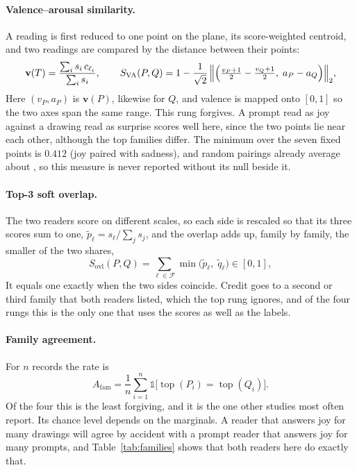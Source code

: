 \paragraph{Valence--arousal similarity.} A reading is first reduced to one point on the plane, its score-weighted centroid, and two readings are compared by the distance between their points:
\begin{equation}
\mathbf{v}(T) = \frac{\sum_i s_i\, c_{\ell_i}}{\sum_i s_i}, \qquad
S_{\mathrm{VA}}(P, Q) = 1 - \frac{1}{\sqrt{2}}\,\Bigl\|\Bigl(\tfrac{v_P + 1}{2} - \tfrac{v_Q + 1}{2},\; a_P - a_Q\Bigr)\Bigr\|_2 ,
\label{eq:va}
\end{equation}
Here $(v_P, a_P)$ is $\mathbf{v}(P)$, likewise for $Q$, and valence is mapped onto $[0,1]$ so the two axes span the same range. This rung forgives. A prompt read as joy against a drawing read as surprise scores well here, since the two points lie near each other, although the top families differ. The minimum over the seven fixed points is $0.412$ (joy paired with sadness), and random pairings already average about \FullNeuVaNull{}, so this measure is never reported without its null beside it.

\paragraph{Top-3 soft overlap.} The two readers score on different scales, so each side is rescaled so that its three scores sum to one, $\tilde{p}_\ell = s_\ell / \sum_j s_j$, and the overlap adds up, family by family, the smaller of the two shares,
\begin{equation}
S_{\mathrm{ovl}}(P, Q) = \sum_{\ell \in \mathcal{F}} \min\bigl(\tilde{p}_\ell,\; \tilde{q}_\ell\bigr) \in [0, 1],
\label{eq:overlap}
\end{equation}
It equals one exactly when the two sides coincide. Credit goes to a second or third family that both readers listed, which the top rung ignores, and of the four rungs this is the only one that uses the scores as well as the labels.

\paragraph{Family agreement.} For $n$ records the rate is
\begin{equation}
A_{\mathrm{fam}} = \frac{1}{n} \sum_{i=1}^{n} \mathbb{1}\bigl[\operatorname{top}(P_i) = \operatorname{top}(Q_i)\bigr].
\label{eq:family}
\end{equation}
Of the four this is the least forgiving, and it is the one other studies most often report. Its chance level depends on the marginals. A reader that answers joy for many drawings will agree by accident with a prompt reader that answers joy for many prompts, and Table~\ref{tab:families} shows that both readers here do exactly that.

